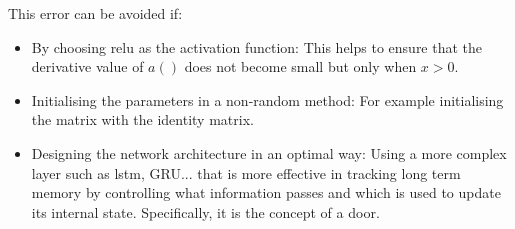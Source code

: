 \begin{itemize}
    This error can be avoided if:
    \begin{itemize}
        \item By choosing \acrshort{relu} as the activation function: This helps to ensure that the derivative value of $a()$ does not become small but only when $x>0$.
        \item Initialising the parameters in a non-random method: For example initialising the matrix with the identity matrix.
        \item Designing the network architecture in an optimal way: Using a more complex layer such as \acrshort{lstm}, GRU... that is more effective in tracking long term memory by controlling what information passes and which is used to update its internal state. Specifically, it is the concept of a door.
    \end{itemize}
\end{itemize}